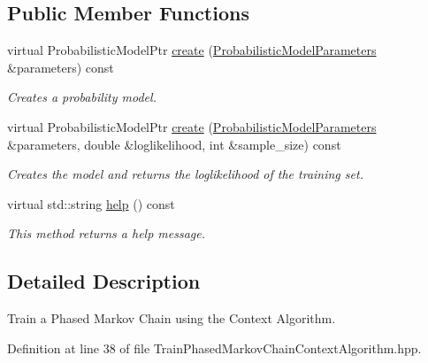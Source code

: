 \subsection*{Public Member Functions}
\begin{DoxyCompactItemize}
\item 
virtual Probabilistic\+Model\+Ptr \hyperlink{classtops_1_1TrainPhasedMarkovChainContextAlgorithm_aa97236d43efb5312776d41ae36827d08}{create} (\hyperlink{classtops_1_1ProbabilisticModelParameters}{Probabilistic\+Model\+Parameters} \&parameters) const
\begin{DoxyCompactList}\small\item\em Creates a probability model. \end{DoxyCompactList}\item 
\mbox{\label{classtops_1_1TrainPhasedMarkovChainContextAlgorithm_a16c1d69fff51b49621daffee37639b13}} 
virtual Probabilistic\+Model\+Ptr \hyperlink{classtops_1_1TrainPhasedMarkovChainContextAlgorithm_a16c1d69fff51b49621daffee37639b13}{create} (\hyperlink{classtops_1_1ProbabilisticModelParameters}{Probabilistic\+Model\+Parameters} \&parameters, double \&loglikelihood, int \&sample\+\_\+size) const
\begin{DoxyCompactList}\small\item\em Creates the model and returns the loglikelihood of the training set. \end{DoxyCompactList}\item 
\mbox{\label{classtops_1_1TrainPhasedMarkovChainContextAlgorithm_aee635d00ef21f80055412b21dd94d061}} 
virtual std\+::string \hyperlink{classtops_1_1TrainPhasedMarkovChainContextAlgorithm_aee635d00ef21f80055412b21dd94d061}{help} () const
\begin{DoxyCompactList}\small\item\em This method returns a help message. \end{DoxyCompactList}\end{DoxyCompactItemize}


\subsection{Detailed Description}
Train a Phased Markov Chain using the Context Algorithm. 

Definition at line 38 of file Train\+Phased\+Markov\+Chain\+Context\+Algorithm.\+hpp.



